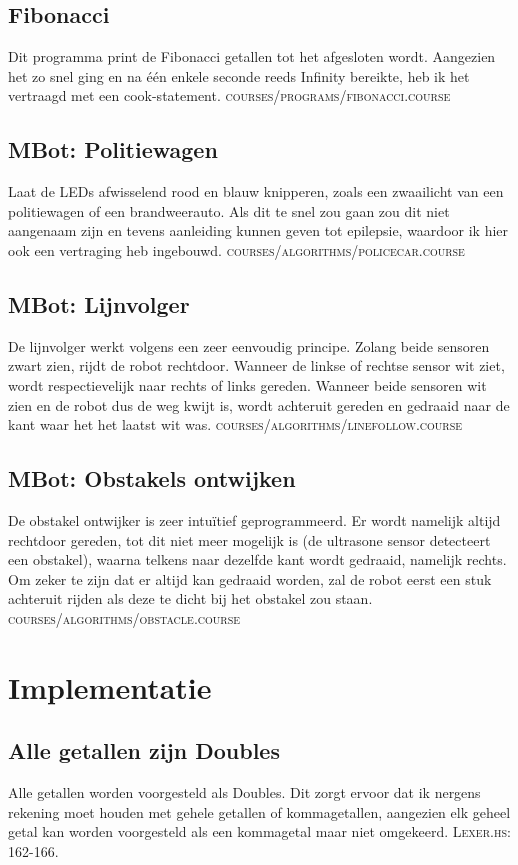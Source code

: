 \documentclass[12pt,a4paper]{report}
\begin{document}
\section{Fibonacci}
Dit programma print de Fibonacci getallen tot het afgesloten wordt. Aangezien het zo snel ging en na één enkele seconde reeds Infinity bereikte, heb ik het vertraagd met een cook-statement. \textsc{courses/programs/fibonacci.course}

\section{MBot: Politiewagen}
Laat de LEDs afwisselend rood en blauw knipperen, zoals een zwaailicht van een politiewagen of een brandweerauto. Als dit te snel zou gaan zou dit niet aangenaam zijn en tevens aanleiding kunnen geven tot epilepsie, waardoor ik hier ook een vertraging heb ingebouwd. \textsc{courses/algorithms/policecar.course}

\section{MBot: Lijnvolger}
De lijnvolger werkt volgens een zeer eenvoudig principe. Zolang beide sensoren zwart zien, rijdt de robot rechtdoor. Wanneer de linkse of rechtse sensor wit ziet, wordt respectievelijk naar rechts of links gereden. Wanneer beide sensoren wit zien en de robot dus de weg kwijt is, wordt achteruit gereden en gedraaid naar de kant waar het het laatst wit was. \textsc{courses/algorithms/linefollow.course}

\section{MBot: Obstakels ontwijken}
De obstakel ontwijker is zeer intuïtief geprogrammeerd. Er wordt namelijk altijd rechtdoor gereden, tot dit niet meer mogelijk is (de ultrasone sensor detecteert een obstakel), waarna telkens naar dezelfde kant wordt gedraaid, namelijk rechts. Om zeker te zijn dat er altijd kan gedraaid worden, zal de robot eerst een stuk achteruit rijden als deze te dicht bij het obstakel zou staan. \textsc{courses/algorithms/obstacle.course}

\chapter{Implementatie}
\section{Alle getallen zijn Doubles}
Alle getallen worden voorgesteld als Doubles. Dit zorgt ervoor dat ik nergens rekening moet houden met gehele getallen of kommagetallen, aangezien elk geheel getal kan worden voorgesteld als een kommagetal maar niet omgekeerd. \textsc{Lexer.hs: 162-166.}
\end{document}
